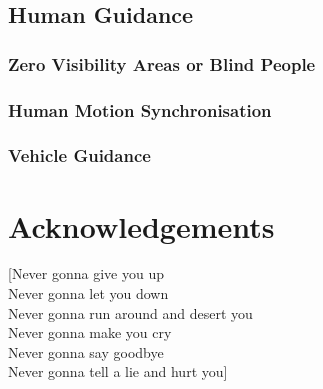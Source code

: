 \documentclass[a4paper, 12pt]{report}
\begin{document}
	\section{Human Guidance}
		\subsection{Zero Visibility Areas or Blind People}
		\subsection{Human Motion Synchronisation}
		\subsection{Vehicle Guidance}

\chapter{Acknowledgements}

[Never gonna give you up\\
Never gonna let you down\\
Never gonna run around and desert you\\
Never gonna make you cry\\
Never gonna say goodbye\\
Never gonna tell a lie and hurt you]

\newpage

\end{document}
